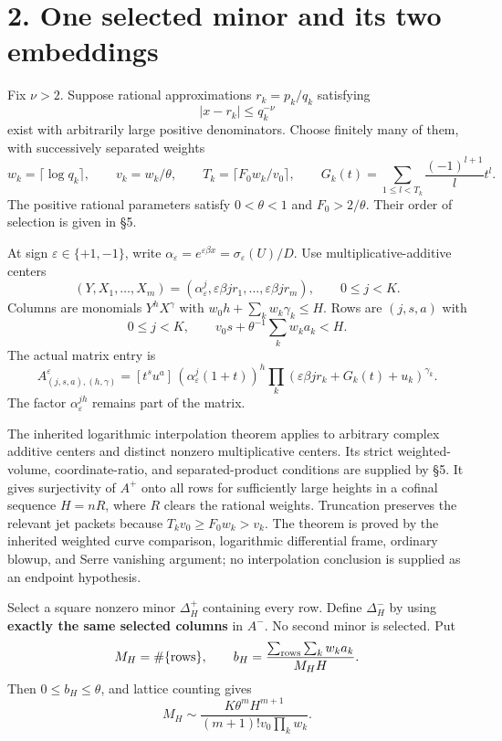 \documentclass[11pt]{article}
\begin{document}
\section{2. One selected minor and its two
embeddings}\label{one-selected-minor-and-its-two-embeddings}

Fix \(\nu>2\). Suppose rational approximations \(r_k=p_k/q_k\)
satisfying \[
|x-r_k|\le q_k^{-\nu}
\tag{6}
\] exist with arbitrarily large positive denominators. Choose finitely
many of them, with successively separated weights \[
w_k=\lceil\log q_k\rceil,\qquad v_k=w_k/\theta,\qquad
T_k=\lceil F_0w_k/v_0\rceil,\qquad
G_k(t)=\sum_{1\le l<T_k}\frac{(-1)^{l+1}}l t^l.
\] The positive rational parameters satisfy \(0<\theta<1\) and
\(F_0>2/\theta\). Their order of selection is given in §5.

At sign \(\varepsilon\in\{+1,-1\}\), write
\(\alpha_\varepsilon=e^{\varepsilon\beta x}=\sigma_\varepsilon(U)/D\).
Use multiplicative-additive centers \[
(Y,X_1,\ldots,X_m)=
(\alpha_\varepsilon^j,\varepsilon\beta jr_1,\ldots,\varepsilon\beta jr_m),
\qquad 0\le j<K.
\] Columns are monomials \(Y^hX^\gamma\) with
\(w_0h+\sum_kw_k\gamma_k\le H\). Rows are \((j,s,a)\) with \[
0\le j<K,\qquad v_0s+\theta^{-1}\sum_kw_ka_k<H.
\] The actual matrix entry is \[
A^\varepsilon_{(j,s,a),(h,\gamma)}=
[t^su^a]\,(\alpha_\varepsilon^j(1+t))^h
\prod_k(\varepsilon\beta jr_k+G_k(t)+u_k)^{\gamma_k}.
\tag{7}
\] The factor \(\alpha_\varepsilon^{jh}\) remains part of the matrix.

The inherited logarithmic interpolation theorem applies to arbitrary
complex additive centers and distinct nonzero multiplicative centers.
Its strict weighted-volume, coordinate-ratio, and separated-product
conditions are supplied by §5. It gives surjectivity of \(A^+\) onto all
rows for sufficiently large heights in a cofinal sequence \(H=nR\),
where \(R\) clears the rational weights. Truncation preserves the
relevant jet packets because \(T_kv_0\ge F_0w_k>v_k\). The theorem is
proved by the inherited weighted curve comparison, logarithmic
differential frame, ordinary blowup, and Serre vanishing argument; no
interpolation conclusion is supplied as an endpoint hypothesis.

Select a square nonzero minor \(\Delta_H^+\) containing every row.
Define \(\Delta_H^-\) by using \textbf{exactly the same selected
columns} in \(A^-\). No second minor is selected. Put \[
M_H=\#\{\text{rows}\},\qquad
b_H=\frac{\sum_{\rm rows}\sum_kw_ka_k}{M_HH}.
\] Then \(0\le b_H\le\theta\), and lattice counting gives \[
M_H\sim\frac{K\theta^mH^{m+1}}{(m+1)!v_0\prod_kw_k}.
\tag{8}
\]
\end{document}
